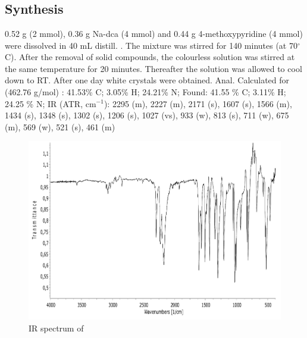 \section{}
\subsection{Synthesis}
0.52 g  (2 mmol), 0.36 g Na-dca (4 mmol) and 0.44 g 4-methoxypyridine (4 mmol) were dissolved in 40 mL distill. . The mixture was stirred for 140 minutes (at 70$^\circ$C). After the removal of solid compounds, the colourless solution was stirred at the same temperature for 20 minutes. Thereafter the solution was allowed to cool down to RT. After one day white crystals were obtained. Anal. Calculated for  (462.76 g/mol) : 41.53\% C; 3.05\% H; 24.21\% N; Found: 41.55 \% C; 3.11\% H; 24.25 \% N; IR (ATR, cm$^{-1}$): 2295 (m), 2227 (m), 2171 (s), 1607 (s), 1566 (m), 1434 (s), 1348 (s), 1302 (s), 1206 (s), 1027 (vs), 933 (w), 813 (s), 711 (w), 675 (m), 569 (w), 521 (s), 461 (m)

\begin{figure}[htpb!]
\centering
\includegraphics[width=1\textwidth]{figures/CdD4MOP-IR_1.pdf}
\caption{IR spectrum of }
\end{figure}


\newpage
